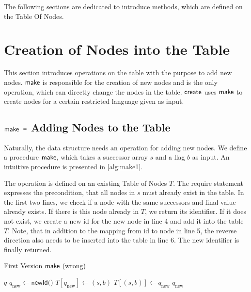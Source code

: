 \par 

The following sections are dedicated to introduce methods, which are defined on the Table Of Nodes. 

\section{Creation of Nodes into the Table}
This section introduces operations on the table with the purpose to add new nodes. $\operatorname{\textsf{make}}$ is responsible for the creation of new nodes and is the only operation, which can directly change the nodes in the table. $\operatorname{\textsf{create}}$ uses $\operatorname{\textsf{make}}$ to create nodes for a certain restricted language given as input.

\subsection{$\operatorname{\textsf{make}}$ - Adding Nodes to the Table}
Naturally, the data structure needs an operation for adding new nodes. We define a procedure $\operatorname{\textsf{make}}$, which takes a successor array $s$ and a flag $b$ as input. An intuitive procedure is presented in \autoref{alg:make1}. 

\par

The operation is defined on an existing Table of Nodes $T$.
The require statement expresses the precondition, that all nodes in $s$ must already exist in the table. In the first two lines, we check if a node with the same successors and final value already exists. If there is this node already in $T$, we return its identifier. If it does not exist, we create a new id for the new node in line 4 and add it into the table $T$. Note, that in addition to the mapping from id to node in line 5, the reverse direction also needs to be inserted into the table in line 6. The new identifier is finally returned.

\begin{algorithm}
\caption{First Version $\operatorname{\textsf{make}}$ (wrong)}\label{alg:make1}
\begin{algorithmic}[1]
\Return $q$
\Else
\State $q_{\text{new}} \gets \textsf{newId()}$
\State $T[q_{\text{new}}] \gets (s,b)$
\State $T[(s,b)] \gets q_{\text{new}}$
\Return $q_{\text{new}}$
\EndIf
\end{algorithmic}
\end{algorithm}

